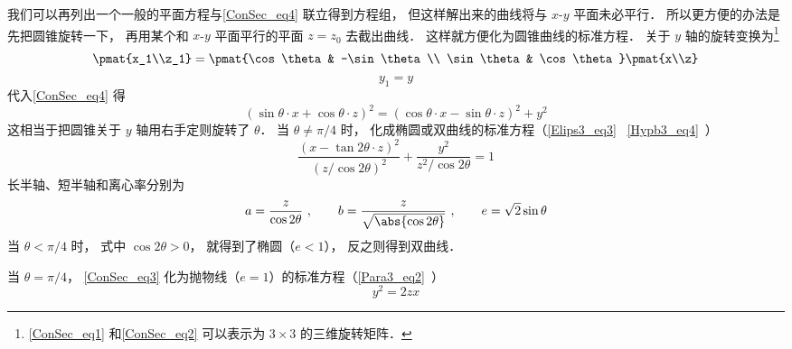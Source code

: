 我们可以再列出一个一般的平面方程与\autoref{ConSec_eq4} 联立得到方程组， 但这样解出来的曲线将与 $x$-$y$ 平面未必平行． 所以更方便的办法是先把圆锥旋转一下， 再用某个和 $x$-$y$ 平面平行的平面 $z = z_0$ 去截出曲线． 这样就方便化为圆锥曲线的标准方程． 关于 $y$ 轴的旋转变换为\footnote{\autoref{ConSec_eq1} 和\autoref{ConSec_eq2} 可以表示为 $3\times 3$ 的三维旋转矩阵．}
\begin{equation}\label{ConSec_eq1}
\pmat{x_1\\z_1} = \pmat{\cos\theta & -\sin\theta\\ \sin\theta & \cos\theta}\pmat{x\\z}
\end{equation}
\begin{equation}\label{ConSec_eq2}
y_1 = y
\end{equation}
代入\autoref{ConSec_eq4} 得
\begin{equation}\label{ConSec_eq3}
(\sin\theta\cdot x + \cos\theta\cdot z)^2 = (\cos\theta\cdot x - \sin\theta\cdot z)^2 + y^2
\end{equation}
这相当于把圆锥关于 $y$ 轴用右手定则旋转了 $\theta$． 当 $\theta \ne \pi/4$ 时， 化成椭圆或双曲线的标准方程（\autoref{Elips3_eq3}~ \autoref{Hypb3_eq4}~）
\begin{equation}
\frac{(x - \tan2\theta \cdot z)^2}{(z/\cos2\theta)^2} + \frac{y^2}{z^2/\cos2\theta} = 1
\end{equation}
长半轴、短半轴和离心率分别为
\begin{equation}
a = \frac{z}{\cos2\theta}~,
\qquad
b = \frac{z}{\sqrt{\abs{\cos2\theta}}}~,
\qquad
e = \sqrt{2}\sin\theta
\end{equation}
当 $\theta < \pi/4$ 时， 式中 $\cos2\theta > 0$， 就得到了椭圆（$e < 1$）， 反之则得到双曲线．

当 $\theta = \pi/4$， \autoref{ConSec_eq3} 化为抛物线（$e = 1$）的标准方程（\autoref{Para3_eq2}~）
\begin{equation}
y^2 = 2zx
\end{equation}
